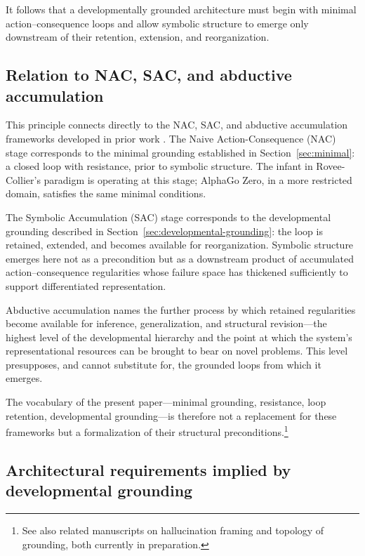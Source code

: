\documentclass[11pt]{article}
\begin{document}
It follows that a developmentally grounded architecture must begin with minimal
action--consequence loops and allow symbolic structure to emerge only
downstream of their retention, extension, and reorganization.

\subsection{Relation to NAC, SAC, and abductive accumulation}
\label{sec:nac-sac}

This principle connects directly to the NAC, SAC, and abductive
accumulation frameworks developed in prior work \citep{Minamoto_prep}.
The Naive Action-Consequence (NAC) stage corresponds to the minimal
grounding established in Section~\ref{sec:minimal}: a closed loop with
resistance, prior to symbolic structure. The infant in Rovee-Collier's
paradigm is operating at this stage; AlphaGo Zero, in a more
restricted domain, satisfies the same minimal conditions.

The Symbolic Accumulation (SAC) stage corresponds to the developmental
grounding described in Section~\ref{sec:developmental-grounding}: the
loop is retained, extended, and becomes available for reorganization.
Symbolic structure emerges here not as a precondition but as a
downstream product of accumulated action--consequence regularities
whose failure space has thickened sufficiently to support
differentiated representation.

Abductive accumulation names the further process by which retained
regularities become available for inference, generalization, and
structural revision---the highest level of the developmental hierarchy
and the point at which the system's representational resources can be
brought to bear on novel problems. This level presupposes, and cannot
substitute for, the grounded loops from which it emerges.

The vocabulary of the present paper---minimal grounding, resistance,
loop retention, developmental grounding---is therefore not a
replacement for these frameworks but a formalization of their
structural preconditions.\footnote{See also related manuscripts on
hallucination framing and topology of grounding, both currently in
preparation.}

\subsection{Architectural requirements implied by developmental grounding}
\label{sec:requirements}
\end{document}
